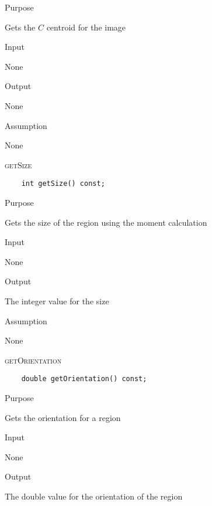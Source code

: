 \documentclass[pdftex, 11pt]{article}
\begin{document}
\begin{description}
\begin{description}
			\item{Purpose}

				Gets the $C$ centroid for the image

			\item{Input}

				None

			\item{Output}

				None

			\item{Assumption}

				None

		\end{description}

	\item{\textsc{getSize}}
		\begin{description}
\begin{lstlisting}
	int getSize() const;
\end{lstlisting}

			\item{Purpose}

				Gets the size of the region using the moment calculation

			\item{Input}

				None

			\item{Output}

				The integer value for the size

			\item{Assumption}

				None

		\end{description}

	\item{\textsc{getOrientation}}
		\begin{description}
\begin{lstlisting}
	double getOrientation() const;
\end{lstlisting}

			\item{Purpose}

				Gets the orientation for a region

			\item{Input}

				None

			\item{Output}

				The double value for the orientation of the region


\end{description}
\end{description}
\end{document}
